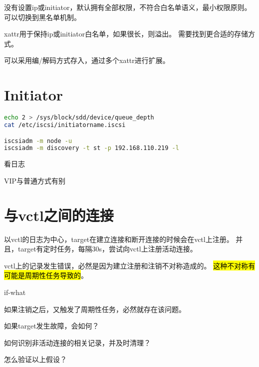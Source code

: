 没有设置ip或initiator，默认拥有全部权限，不符合白名单语义，最小权限原则。
可以切换到黑名单机制。

xattr用于保持ip或initiator白名单，如果很长，则溢出。
需要找到更合适的存储方式。

可以采用编/解码方式存入，通过多个xattr进行扩展。

\section{Initiator}

\begin{lstlisting}[language=bash,frame=single]
echo 2 > /sys/block/sdd/device/queue_depth
cat /etc/iscsi/initiatorname.iscsi

iscsiadm -m node -u
iscsiadm -m discovery -t st -p 192.168.110.219 -l
\end{lstlisting}

看日志

VIP与普通方式有别

\section{与vctl之间的连接}

以vctl的日志为中心，target在建立连接和断开连接的时候会在vctl上注册。
并且，target有定时任务，每隔30s，尝试向vctl上注册活动连接。

vctl上的记录发生错误，必然是因为建立注册和注销不对称造成的。
\hl{这种不对称有可能是周期性任务导致的}。

if-what
\begin{enumbox}
\item 如果注销之后，又触发了周期性任务，必然就存在该问题。
\item 如果target发生故障，会如何？
\end{enumbox}

如何识别非活动连接的相关记录，并及时清理？

怎么验证以上假设？
